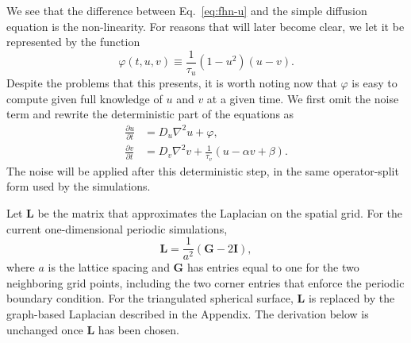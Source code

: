 We see that the difference between Eq.~\eqref{eq:fhn-u} and the simple
diffusion equation is the non-linearity.  For reasons that will later
become clear, we let it be represented by the function
\begin{equation}
  \varphi(t,u,v)
    \equiv \frac{1}{\tau_u}(1-u^2)(u-v).
  \label{eq:phi-definition}
\end{equation}
Despite the problems that this presents, it is worth noting now that
\(\varphi\) is easy to compute given full knowledge of \(u\) and \(v\) at
a given time.  We first omit the noise term and rewrite the deterministic
part of the equations as
\begin{align}
  \frac{\partial u}{\partial t}
    &= D_u\nabla^2u+\varphi,
    \label{eq:deterministic-u}\\
  \frac{\partial v}{\partial t}
    &= D_v\nabla^2v+\frac{1}{\tau_v}(u-\alpha v+\beta).
    \label{eq:deterministic-v}
\end{align}
The noise will be applied after this deterministic step, in the same
operator-split form used by the simulations.

Let \(\mathbf L\) be the matrix that approximates the Laplacian on the
spatial grid.  For the current one-dimensional periodic simulations,
\begin{equation}
  \mathbf L = \frac{1}{a^2}(\mathbf G-2\mathbf I),
  \label{eq:periodic-laplacian}
\end{equation}
where \(a\) is the lattice spacing and \(\mathbf G\) has entries equal to
one for the two neighboring grid points, including the two corner entries
that enforce the periodic boundary condition.  For the triangulated
spherical surface, \(\mathbf L\) is replaced by the graph-based Laplacian
described in the Appendix.  The derivation below is unchanged once
\(\mathbf L\) has been chosen.

